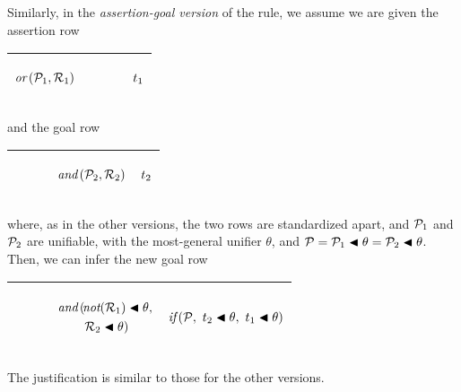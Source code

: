 \documentclass[runningheads]{llncs}
\DeclareMathOperator{\uand}{\emph{and}\,}
\DeclareMathOperator{\uor}{\emph{or}\,}
\DeclareMathOperator{\unot}{\emph{not}\kern-.0pt}
\begin{document}
Similarly, in the \emph{assertion-goal version} of the rule, we assume we are given the assertion row
   
   \begin{center}
\begin{tabular} {T}
\hline
    \begin{center}$\uor(\expsub{\mathcal{P}}{1},\expsub{\mathcal{R}}{1})$ \end{center}& $\qquad$ & \begin{center}${t}_{1}$\end{center} \\
  \hline
\end{tabular}
\end{center}
\noindent and the goal row
  \begin{center}
\begin{tabular} {T}
\hline
   $\qquad$ & \begin{center}$ \uand (\expsub{\mathcal{P}}{2},\expsub{\mathcal{R}}{2})$ \end{center}   & \begin{center}${t}_{2}$\end{center} \\
  \hline
\end{tabular}
\end{center}
 
\noindent where, as in the other versions, the two rows are standardized apart, and ${\mathcal{P}}_{1}$ and ${\mathcal{P}}_{2}$ are unifiable, with the most-general unifier $\theta$, and $ \mathcal{P} = {\mathcal{P}}_{1} \blacktriangleleft \theta = {\mathcal{P}}_{2} \blacktriangleleft \theta$.  Then, we can infer the new goal row
  \begin{center}
\begin{tabular} {T}
\hline
   $\qquad$ & 
   \begin{center}
   $\uand(\!
 \begin{aligned}[t]
 &\!\!\unot(\expsub{\mathcal{R}}{1}) \apply \theta,  \\
 &\expsub{\mathcal{R}}{2} \apply \theta)
 \end{aligned}$ 
 \end{center}
 &   \begin{center}$\emph{if}\,( {\mathcal{P}},\allowbreak \ {{t}_{2} \blacktriangleleft \theta},\allowbreak \ {{t}_{1} \blacktriangleleft \theta})$\end{center}\\
  \hline
\end{tabular}
\end{center}
\noindent The justification is similar to those for the other versions.
\end{document}
